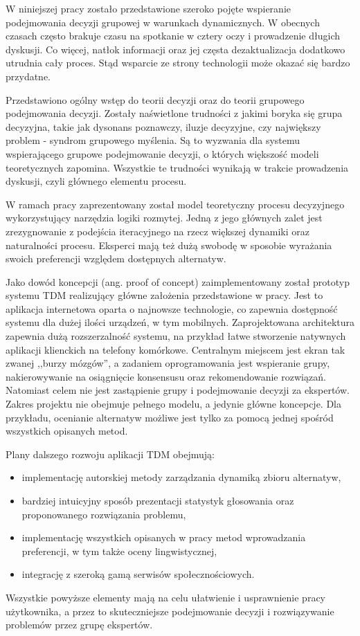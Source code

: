 W niniejszej pracy zostało przedstawione szeroko pojęte wspieranie podejmowania
decyzji grupowej w warunkach dynamicznych. W obecnych czasach często brakuje
czasu na spotkanie w cztery oczy i prowadzenie długich dyskusji. Co więcej,
natłok informacji oraz jej częsta dezaktualizacja dodatkowo utrudnia cały
proces. Stąd wsparcie ze strony technologii może okazać się bardzo przydatne.

Przedstawiono ogólny wstęp do teorii decyzji oraz do teorii grupowego
podejmowania decyzji. Zostały naświetlone trudności z jakimi boryka się grupa
decyzyjna, takie jak dysonans poznawczy, iluzje decyzyjne, czy największy
problem - syndrom grupowego myślenia. Są to wyzwania dla systemu wspierającego
grupowe podejmowanie decyzji, o których większość modeli teoretycznych zapomina.
Wszystkie te trudności wynikają w trakcie prowadzenia dyskusji, czyli
głównego elementu procesu.

W ramach pracy zaprezentowany został model teoretyczny procesu decyzyjnego
wykorzystujący narzędzia logiki rozmytej. Jedną z jego głównych zalet jest
zrezygnowanie z podejścia iteracyjnego na rzecz większej dynamiki oraz
naturalności procesu. Eksperci mają też dużą swobodę w sposobie wyrażania swoich
preferencji względem dostępnych alternatyw.

Jako dowód koncepcji (ang. proof of concept) zaimplementowany został prototyp
systemu TDM realizujący główne założenia przedstawione w pracy. Jest to
aplikacja internetowa oparta o najnowsze technologie, co zapewnia dostępność
systemu dla dużej ilości urządzeń, w tym mobilnych. Zaprojektowana
architektura zapewnia dużą rozszerzalność systemu, na przykład łatwe
stworzenie natywnych aplikacji klienckich na telefony komórkowe. Centralnym
miejscem jest ekran tak zwanej ,,burzy mózgów'', a zadaniem oprogramowania jest
wspieranie grupy, nakierowywanie na osiągnięcie konsensusu oraz rekomendowanie
rozwiązań. Natomiast celem nie jest zastąpienie grupy i podejmowanie decyzji za
ekspertów. Zakres projektu nie obejmuje pełnego modelu, a jedynie główne
koncepcje. Dla przykładu, ocenianie alternatyw możliwe jest tylko za pomocą
jednej spośród wszystkich opisanych metod.

Plany dalszego rozwoju aplikacji TDM obejmują:
\begin{itemize}
  \item implementację autorskiej metody zarządzania dynamiką zbioru alternatyw,
  \item bardziej intuicyjny sposób prezentacji statystyk głosowania oraz
  proponowanego rozwiązania problemu,
  \item implementację wszystkich opisanych w pracy metod wprowadzania
  preferencji, w tym także oceny lingwistycznej,
  \item integrację z szeroką gamą serwisów społecznościowych.
\end{itemize}
Wszystkie powyższe elementy mają na celu ułatwienie i usprawnienie pracy
użytkownika, a przez to skuteczniejsze podejmowanie decyzji i rozwiązywanie
problemów przez grupę ekspertów.


